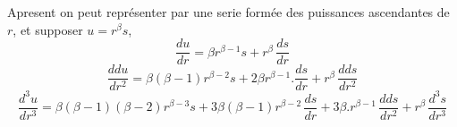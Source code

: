 \documentclass[11pt,a4paper]{article}
\begin{document}
Apresent on peut représenter par  une serie formée des
puissances ascendantes de $r$, et supposer $u = r^{\beta}s$,   
\[ \frac{du}{dr} = \beta r^{\beta-1}s + r^{\beta}\,\frac{ds}{dr} \]
\[ \frac{ddu}{dr^{2}} = \beta(\beta-1)r^{\beta-2}s + 2\beta r^{\beta-1}.\frac{ds}{dr} + r^{\beta}\,\frac{dds}{dr^{2}} \]
\[ \frac{d^{3}u}{dr^{3}} = \beta(\beta-1)(\beta-2)r^{\beta-3}s + 3\beta(\beta-1)r^{\beta-2}\,\frac{ds}{dr} + 3\beta.r^{\beta-1}\,\frac{dds}{dr^{2}} + r^{\beta}\,\frac{d^{3}s}{dr^{3}} \]
\end{document}
